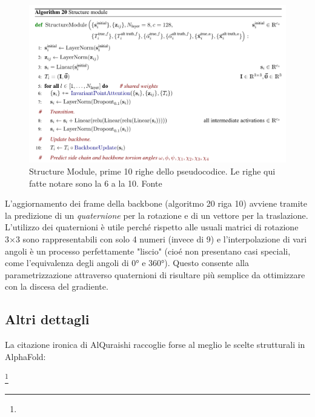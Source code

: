 \begin{figure}[!htb]
	\centering
	\includegraphics[scale=0.5]{images/alg20.png}
	\caption{Structure Module, prime 10 righe dello pseudocodice. Le righe qui fatte notare sono la 6 a la 10. Fonte\cite{supplementaryjumper2021highly}}
	\label{fig:alg-20}
\end{figure}

L'aggiornamento dei frame della backbone (algoritmo 20 riga 10) avviene tramite la predizione di un \textit{quaternione} per la rotazione e di un vettore per la traslazione. L'utilizzo dei quaternioni è utile perché rispetto alle usuali matrici di rotazione 3×3 sono rappresentabili con solo 4 numeri (invece di 9) e l'interpolazione di vari angoli è un processo perfettamente "liscio" (cioé non presentano casi speciali, come l'equivalenza degli angoli di 0° e 360°). Questo consente alla parametrizzazione attraverso quaternioni di risultare più semplice da ottimizzare con la discesa del gradiente.

\subsection{Altri dettagli}

La citazione ironica di AlQuraishi raccoglie forse al meglio le scelte strutturali in AlphaFold:

\footnote{}\\

